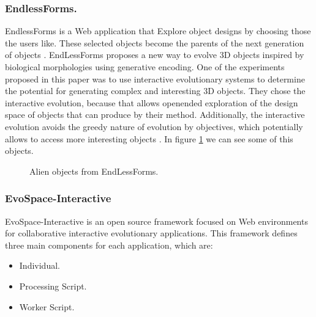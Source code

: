 \subsubsection{EndlessForms.}
EndlessForms is a Web application that Explore object designs by choosing those
the users like. These selected objects become the parents of the next generation
of objects \cite{clune2011evolving}. EndLessForms proposes a new way to evolve
3D objects inspired by biological morphologies using generative encoding. One of
the experiments proposed in this paper was to use interactive evolutionary
systems to determine the potential for generating complex and interesting 3D
objects. They chose the interactive evolution, because that allows openended
exploration of the design space of objects that can produce by their method.
Additionally, the interactive evolution avoids the greedy nature of evolution by
objectives, which potentially allows to access more interesting objects
\cite{clune2011evolving}. In figure \ref{fig:EndlessForms} we can see some of
this objects.

\begin{figure}
\captionsetup{justification=centering,margin=2cm}
\centering
\setlength\fboxsep{0pt}
\setlength\fboxrule{0.7pt}
\caption{Alien objects from EndLessForms.}
\label{fig:EndlessForms}       
\end{figure}

\subsubsection{EvoSpace-Interactive} EvoSpace-Interactive is an open source
framework focused on Web environments for collaborative interactive evolutionary
applications. This framework defines three main components for each application,
which are: 
\begin{itemize} 
	\item Individual.  
	\item Processing Script. 
	\item Worker Script. 
\end{itemize}

